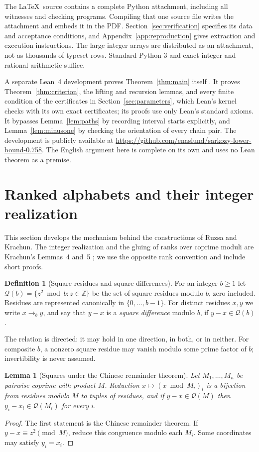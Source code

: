 \documentclass[11pt]{article}
\newtheorem{lemma}[theorem]{Lemma}
\theoremstyle{definition}
\newtheorem{definition}[theorem]{Definition}
\theoremstyle{remark}
\newcommand{\Z}{\mathbb Z}
\newcommand{\QR}{\mathcal Q}
\begin{document}
The \LaTeX\ source contains a complete Python attachment, including all
witnesses and checking programs. Compiling that one source file writes the
attachment and embeds it in the PDF. Section~\ref{sec:verification}
specifies its data and acceptance conditions, and
Appendix~\ref{app:reproduction} gives extraction and execution instructions.
The large integer arrays are distributed as an attachment, not as thousands of
typeset rows. Standard Python 3 and exact integer and rational arithmetic
suffice.

A separate Lean~4 development proves Theorem~\ref{thm:main} itself
\cite{deMouraUllrich2021,Mathlib2020}. It proves Theorem~\ref{thm:criterion},
the lifting and recursion lemmas, and every finite condition of the
certificates in Section~\ref{sec:parameters}, which Lean's kernel checks with
its own exact certificates; its proofs use only Lean's standard axioms. It
bypasses Lemma~\ref{lem:paths} by recording interval starts explicitly, and
Lemma~\ref{lem:minusone} by checking the orientation of every chain pair. The
development is publicly available at
\url{https://github.com/enaslund/sarkozy-lower-bound-0.758}. The English argument here is
complete on its own and uses no Lean theorem as a premise.

\section{Ranked alphabets and their integer realization}\label{sec:ranked}
This section develops the mechanism behind the constructions of Ruzsa and
Krachun. The integer realization and the gluing of ranks over coprime moduli
are Krachun's Lemmas~4 and~5 \cite{Krachun2026}; we use the opposite rank
convention and include short proofs.

\begin{definition}[Square residues and square differences]\label{def:sqrel}
For an integer $b\ge1$ let $\QR(b)=\{z^2\bmod b:z\in\Z\}$ be the set of
square residues modulo $b$, zero included. Residues are represented
canonically in $\{0,\ldots,b-1\}$. For distinct residues $x,y$ we write
$x\to_b y$, and say that $y-x$ is a \emph{square difference} modulo $b$, if
$y-x\in\QR(b)$.
\end{definition}
The relation is directed: it may hold in one direction, in both, or in
neither.
For composite $b$, a nonzero square residue may vanish modulo some prime
factor of $b$; invertibility is never assumed.

\begin{lemma}[Squares under the Chinese remainder theorem]\label{lem:crtsq}
Let $M_1,\ldots,M_n$ be pairwise coprime with product $M$. Reduction
$x\mapsto(x\bmod M_i)_i$ is a bijection from residues modulo $M$ to tuples of
residues, and if $y-x\in\QR(M)$ then $y_i-x_i\in\QR(M_i)$ for every $i$.
\end{lemma}
\begin{proof}
The first statement is the Chinese remainder theorem. If $y-x\equiv z^2
\pmod M$, reduce this congruence modulo each $M_i$. Some coordinates may
satisfy $y_i=x_i$.
\end{proof}
\end{document}
